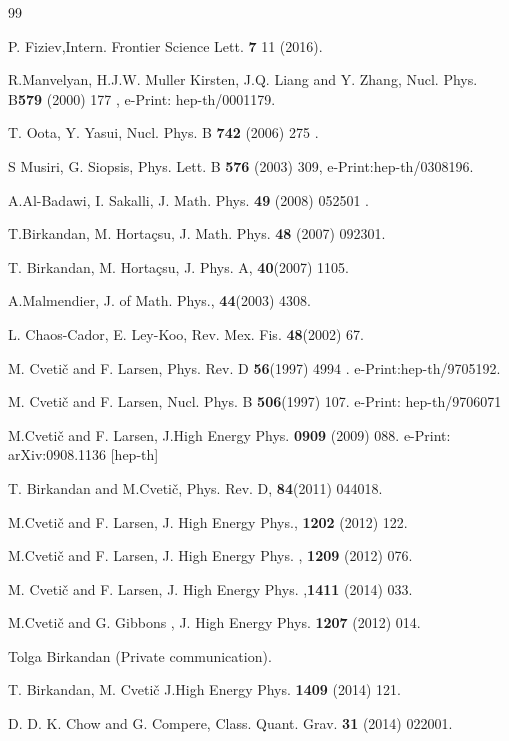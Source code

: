 \documentclass{article}
\begin{document}
\begin{thebibliography}{99}
{ P. Fiziev,Intern. Frontier Science Lett.
\textbf{7} 11 (2016).

 R.Manvelyan, H.J.W. Muller Kirsten, J.Q. Liang and Y. Zhang, Nucl. Phys. B\textbf{579} (2000) 177 , e-Print: hep-th/0001179.

 T. Oota, Y. Yasui, Nucl. Phys. B \textbf{742} (2006) 275 .

 S Musiri, G. Siopsis, Phys. Lett. B \textbf{576} (2003) 309, e-Print:hep-th/0308196.

 A.Al-Badawi, I. Sakalli, J. Math. Phys. \textbf{49} (2008) 052501 .


 T.Birkandan, M. Horta\c{c}su, J. Math. Phys. \textbf{48} (2007) 092301.

 T. Birkandan, M. Horta\c{c}su, J. Phys. A, \textbf{40}(2007)  1105.

 A.Malmendier, J. of Math. Phys., \textbf{44}(2003) 4308.

 L. Chaos-Cador, E. Ley-Koo, Rev. Mex. Fis. \textbf{48}(2002) 67.

 M. Cveti\v{c} and F. Larsen, Phys. Rev. D \textbf{56}(1997) 4994 . e-Print:hep-th/9705192.

 M. Cveti\v{c} and F. Larsen, Nucl. Phys. B \textbf{506}(1997) 107. e-Print: hep-th/9706071

 M.Cveti\v{c} and F. Larsen, J.High Energy Phys. \textbf{0909} (2009) 088. e-Print: arXiv:0908.1136 [hep-th]

 T. Birkandan and M.Cveti\v{c}, Phys. Rev. D, \textbf{84}(2011) 044018.

 M.Cveti\v{c} and F. Larsen, J. High Energy Phys., \textbf{1202} (2012) 122.

  M.Cveti\v{c} and F. Larsen, J. High Energy Phys. ,
\textbf{1209} (2012) 076.

 M. Cveti\v{c} and F. Larsen, J. High Energy Phys.
,\textbf{1411} (2014) 033.

 M.Cveti\v{c} and G. Gibbons , J. High Energy Phys.
\textbf{1207 }(2012) 014.

  Tolga Birkandan (Private communication).

  T. Birkandan, M. Cveti\v{c} J.High Energy Phys.\textbf{ 1409} (2014) 121.

 D. D. K. Chow and G. Compere, Class. Quant. Grav. \textbf{31}   (2014) 022001.

}
\end{thebibliography}
\end{document}
